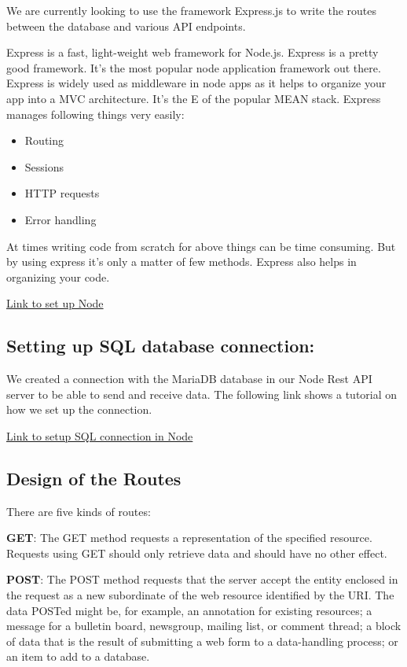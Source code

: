\documentclass[]{book}
\providecommand{\tightlist}{%
  \setlength{\itemsep}{0pt}\setlength{\parskip}{0pt}}
\begin{document}
We are currently looking to use the framework Express.js to write the
routes between the database and various API endpoints.

Express is a fast, light-weight web framework for Node.js. Express is a
pretty good framework. It's the most popular node application framework
out there. Express is widely used as middleware in node apps as it helps
to organize your app into a MVC architecture. It's the E of the popular
MEAN stack. Express manages following things very easily:

\begin{itemize}
\tightlist
\item
  Routing
\item
  Sessions
\item
  HTTP requests
\item
  Error handling
\end{itemize}

At times writing code from scratch for above things can be time
consuming. But by using express it's only a matter of few methods.
Express also helps in organizing your code.

\href{https://medium.com/@onejohi/building-a-simple-rest-api-with-nodejs-and-express-da6273ed7ca9}{Link
to set up Node}

\subsection{Setting up SQL database
connection:}\label{setting-up-sql-database-connection}

We created a connection with the MariaDB database in our Node Rest API
server to be able to send and receive data. The following link shows a
tutorial on how we set up the connection.

\href{https://bezkoder.com/node-js-rest-api-express-mysql/}{Link to
setup SQL connection in Node}

\subsection{Design of the Routes}\label{design-of-the-routes}

There are five kinds of routes:

\textbf{GET}: The GET method requests a representation of the specified
resource. Requests using GET should only retrieve data and should have
no other effect.

\textbf{POST}: The POST method requests that the server accept the
entity enclosed in the request as a new subordinate of the web resource
identified by the URI. The data POSTed might be, for example, an
annotation for existing resources; a message for a bulletin board,
newsgroup, mailing list, or comment thread; a block of data that is the
result of submitting a web form to a data-handling process; or an item
to add to a database.
\end{document}
